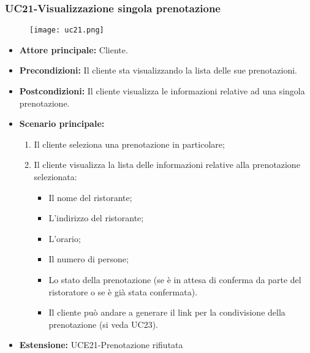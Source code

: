 \subsubsection{UC21-Visualizzazione singola prenotazione}
\begin{figure}[h] \texttt{[image: uc21.png]} \end{figure}
\begin{itemize}
    \item \textbf{Attore principale: } Cliente.
    \item \textbf{Precondizioni: }Il cliente sta visualizzando la lista delle sue prenotazioni.
    \item \textbf{Postcondizioni: }Il cliente visualizza le informazioni relative ad una singola prenotazione.
    \item \textbf{Scenario principale:}
        \begin{enumerate}
            \item Il cliente seleziona una prenotazione in particolare;
            \item Il cliente visualizza la lista delle informazioni relative alla prenotazione selezionata:
            \begin{itemize}
                \item Il nome del ristorante;
                \item L'indirizzo del ristorante;
                \item L'orario;
                \item Il numero di persone;
                \item Lo stato della prenotazione (se è in attesa di conferma da parte del ristoratore
                o se è già stata confermata).
            \item Il cliente può andare a generare il link per la condivisione della prenotazione (si veda UC23).
            \end{itemize}
        \end{enumerate}
    \item \textbf{Estensione: }UCE21-Prenotazione rifiutata
\end{itemize}

